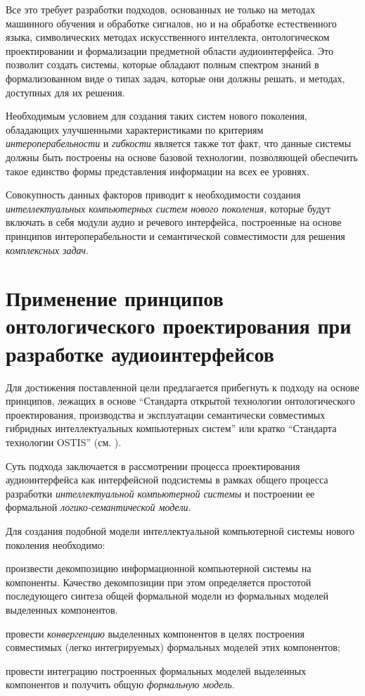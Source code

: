 Все это требует разработки подходов, основанных не только на методах машинного обучения и обработке сигналов, но и на обработке естественного языка, символических методах искусственного интеллекта, онтологическом проектировании и формализации предметной области аудиоинтерфейса. Это позволит создать системы, которые обладают полным спектром знаний в формализованном виде о типах задач, которые они должны решать, и методах, доступных для их решения.

Необходимым условием для создания таких систем нового поколения, обладающих улучшенными характеристиками по критериям \textit{интероперабельности} и \textit{гибкости} является также тот факт, что данные системы должны быть построены на основе базовой технологии, позволяющей обеспечить такое единство формы представления информации на всех ее уровнях.
 
Совокупность данных факторов приводит к необходимости создания \textit{интеллектуальных компьютерных систем нового поколения}, которые будут включать в себя модули аудио и речевого интерфейса, построенные на основе принципов интероперабельности и семантической совместимости для решения \textit{комплексных задач}.


\section{Применение принципов онтологического проектирования при разработке аудиоинтерфейсов}
\label{sec_audio_interfaces_ostis_approach}

Для достижения поставленной цели предлагается прибегнуть к подходу на основе принципов, лежащих в основе ``Стандарта открытой технологии онтологического проектирования, производства и эксплуатации семантически совместимых гибридных интеллектуальных компьютерных систем'' или кратко ``Стандарта технологии OSTIS'' (см. ).

Суть подхода заключается в рассмотрении процесса проектирования аудиоинтерфейса как интерфейсной подсистемы в рамках общего процесса разработки \textit{интеллектуальной компьютерной системы} и построении ее формальной \textit{логико-семантической модели}.

Для создания подобной модели интеллектуальной компьютерной системы нового поколения необходимо:
\begin{textitemize}    
    \item произвести декомпозицию информационной компьютерной системы на компоненты. Качество декомпозиции при этом определяется простотой последующего синтеза общей формальной модели из формальных моделей выделенных компонентов.
    \item провести \textit{конвергенцию} выделенных компонентов в целях построения совместимых (легко интегрируемых) формальных моделей этих компонентов;
    \item провести интеграцию построенных формальных моделей выделенных компонентов и получить общую \textit{формальную модель}.
\end{textitemize}

